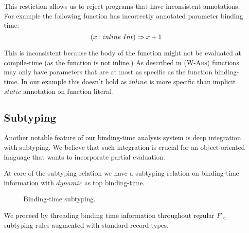 This restiction allows us to reject programs that have inconsistent annotations.
For example the following function has incorrectly annotated parameter binding time:
\begin{equation}\nonumber
    (x: inline\ Int) \Rightarrow x + 1
\end{equation}

This is inconsistent because the body of the function might not be evaluated at compile-time
(as the function is not inline.) As described in (\textsc{W-Abs}) functions may only have parameters
that are at most as specific as the function binding-time. In our example this doesn't hold as $inline$
is more specific than implicit $static$ annotation on function literal.

\subsection{Subtyping}

Another notable feature of our binding-time analysis system is deep integration with subtyping.
We believe that such integration is crucial for an object-oriented language that wants to
incorporate partial evaluation.

At core of the subtyping relation we have a subtyping relation on binding-time information
with $dynamic$ as top binding-time.

\begin{figure}[H]
\begin{multicols}{2}



\end{multicols}
\caption{Binding-time subtyping.}
\end{figure}

We proceed by threading binding time information throughout regular $F_{<:}$ subtyping rules
augmented with standard record types.


